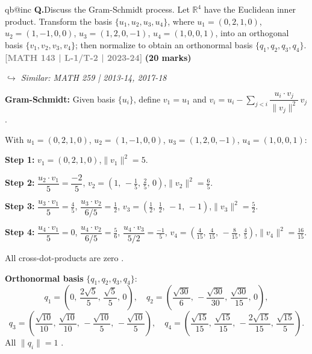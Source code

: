 \documentclass[12pt,a3paper]{article}
\makeatletter
\newcommand{\yr}[1]{\hfill\textcolor{gray}{\small\textbf{[#1]}}}
\newcommand{\mk}[1]{\textcolor{orange!70!black}{\small\textbf{(#1 marks)}}}
\newcommand{\variant}[1]{\par\vspace{1pt}\textcolor{blue!50!black}%
  {\footnotesize\textit{$\hookrightarrow$ Similar: #1}}}
\newcounter{qnum}
\newcommand{\Q}[1]{%
  \csname qb@inc\endcsname
  \needspace{4\baselineskip}
  \refstepcounter{qnum}
  \vspace{6pt}
  \noindent\textbf{Q\theqnum.}\enspace #1\par
}
\makeatother
\begin{document}
\Q{Discuss the Gram-Schmidt process. Let $\mathbb{R}^4$ have the Euclidean inner product. Transform the basis $\{u_1, u_2, u_3, u_4\}$, where $u_1 = (0,2,1,0)$, $u_2 = (1,-1,0,0)$, $u_3 = (1,2,0,-1)$, $u_4 = (1,0,0,1)$, into an orthogonal basis $\{v_1, v_2, v_3, v_4\}$; then normalize to obtain an orthonormal basis $\{q_1, q_2, q_3, q_4\}$.
\yr{MATH 143 | L-1/T-2 | 2023-24} \mk{20}
\variant{MATH 259 | 2013-14, 2017-18}}

\begin{tcolorbox}[enhanced,breakable,
  colback=cD!4,colframe=cD,boxrule=0.8pt,arc=5pt,
  title={\textbf{Answer --- Gram-Schmidt Process on $\mathbb{R}^4$ (Euclidean Inner Product)}},
  fonttitle=\bfseries\color{white},colbacktitle=cD]

\textbf{Gram-Schmidt:} Given basis $\{u_i\}$, define
$v_1=u_1$ and $v_i = u_i - \displaystyle\sum_{j<i}\dfrac{u_i\cdot v_j}{\|v_j\|^2}\,v_j$.

With $u_1=(0,2,1,0)$, $u_2=(1,-1,0,0)$, $u_3=(1,2,0,-1)$, $u_4=(1,0,0,1)$:

\medskip
\textbf{Step 1:} $v_1=(0,2,1,0)$,\quad $\|v_1\|^2=5$.

\textbf{Step 2:} $\dfrac{u_2\cdot v_1}{5}=\dfrac{-2}{5}$,\quad
$v_2=\left(1,\,-\tfrac{1}{5},\,\tfrac{2}{5},\,0\right)$,\quad $\|v_2\|^2=\tfrac{6}{5}$.

\textbf{Step 3:} $\dfrac{u_3\cdot v_1}{5}=\tfrac{4}{5}$,\; $\dfrac{u_3\cdot v_2}{6/5}=\tfrac{1}{2}$,\quad
$v_3=\left(\tfrac{1}{2},\,\tfrac{1}{2},\,-1,\,-1\right)$,\quad $\|v_3\|^2=\tfrac{5}{2}$.

\textbf{Step 4:} $\dfrac{u_4\cdot v_1}{5}=0$,\; $\dfrac{u_4\cdot v_2}{6/5}=\tfrac{5}{6}$,\;
$\dfrac{u_4\cdot v_3}{5/2}=\tfrac{-1}{5}$,\quad
$v_4=\left(\tfrac{4}{15},\,\tfrac{4}{15},\,-\tfrac{8}{15},\,\tfrac{4}{5}\right)$,\quad $\|v_4\|^2=\tfrac{16}{15}$.

All cross-dot-products are zero . \checkmark

\medskip
\textbf{Orthonormal basis} $\{q_1,q_2,q_3,q_4\}$:
\[
q_1 = \left(0,\,\frac{2\sqrt{5}}{5},\,\frac{\sqrt{5}}{5},\,0\right),\quad
q_2 = \left(\frac{\sqrt{30}}{6},\,-\frac{\sqrt{30}}{30},\,\frac{\sqrt{30}}{15},\,0\right),
\]
\[
q_3 = \left(\frac{\sqrt{10}}{10},\,\frac{\sqrt{10}}{10},\,-\frac{\sqrt{10}}{5},\,-\frac{\sqrt{10}}{5}\right),\quad
q_4 = \left(\frac{\sqrt{15}}{15},\,\frac{\sqrt{15}}{15},\,-\frac{2\sqrt{15}}{15},\,\frac{\sqrt{15}}{5}\right).
\]
All $\|q_i\|=1$ . \checkmark

\end{tcolorbox}
\end{document}
